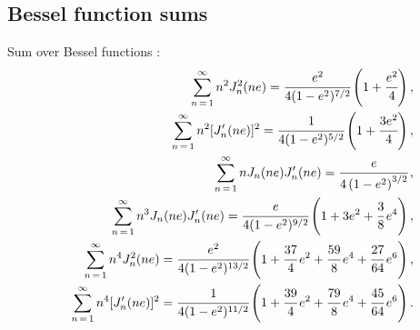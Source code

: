 \documentclass[aps,prd]{revtex4-2}
\begin{document}
\subsection{Bessel function sums} \label{Bessel-formulas}
Sum over Bessel functions \cite{Peters:1963ux}:
\begin{eqnarray}\label{eq:Peter-Matthews-sum}
&& \sum_{n\,=\,1}^{\infty}  n^{2}J_{n}^{2}(ne) = \cfrac{e^{2}}{4(1-e^{2})^{7/2}}\left(1 + \cfrac{e^{2}}{4} \right), \label{B1} \\
&& \sum_{n\,=\,1}^{\infty}  n^{2}[J_{n}^{\prime}(ne)]^{2} = \cfrac{1}{4(1-e^{2})^{5/2}}\left(1 + \cfrac{3e^{2}}{4} \right), \label{B2} \\
&& \sum_{n\,=\,1}^{\infty} n J_{n}(ne) J^{\prime}_{n}(ne) = \cfrac{e}{4\left(1-e^2\right)^{3/2}}\,,\label{B3} \\
&& \sum_{n\,=\,1}^{\infty}  n^{3} J_{n}(ne) J_{n}^{\prime}(ne) = \cfrac{e}{4(1-e^{2})^{9/2}}\left(1 + 3e^{2} + \cfrac{3}{8}\,e^{4} \right),  \label{B4}\\
&& \sum_{n\,=\,1}^{\infty}  n^{4} J_{n}^{2}(ne) = \cfrac{e^{2}}{4(1-e^{2})^{13/2}}\left(1 + \cfrac{37}{4}\,e^{2} + \cfrac{59}{8}\,e^{4} + \cfrac{27}{64}\,e^{6} \right), \label{B5} \\
&& \sum_{n\,=\,1}^{\infty}  n^{4} [J_{n}^{\prime}(ne)]^{2} = \cfrac{1}{4(1-e^{2})^{11/2}}\left(1 + \cfrac{39}{4}\,e^{2} + \cfrac{79}{8}\,e^{4} + \cfrac{45}{64}\,e^{6} \right). \label{B6}
\end{eqnarray}








\end{document}
